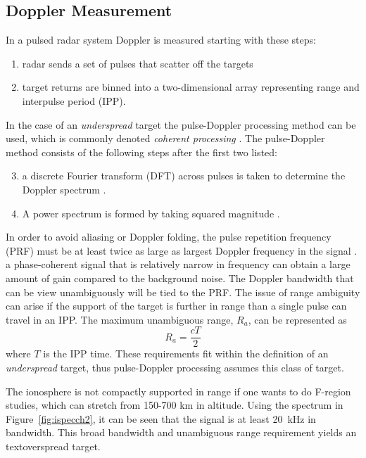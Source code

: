 \subsection{Doppler Measurement}
In a pulsed radar system Doppler is measured starting with these steps:
\begin{enumerate}
\label{list:uno}
\item radar sends a set of pulses that scatter off the targets 
\item target returns are binned into a two-dimensional array representing range and interpulse period (IPP).
\end{enumerate}
In the case of an \textit{underspread} target the pulse-Doppler processing method can be used, which is commonly denoted \textit{coherent processing} \cite{richards2014fundamentals,richards2010principles,richards2014principles,skolnik2008radar}. The pulse-Doppler method consists of the following steps after the first two listed:
\begin{enumerate}
  \setcounter{enumi}{2}
  \item a discrete Fourier transform (DFT) across pulses is taken to determine the Doppler spectrum \cite{richards2014fundamentals}. 
\item A power spectrum is formed by taking squared magnitude .  
\end{enumerate}

In order to avoid aliasing or Doppler folding, the pulse repetition frequency (PRF) must be at least twice as large as largest Doppler frequency in the signal \cite{dtsp:openhiem}. 
a phase-coherent signal that is relatively narrow in frequency can obtain a large amount of gain compared to the background noise. The Doppler bandwidth that can be view unambiguously will be tied to the PRF. The issue of range ambiguity can arise if the support of the target is further in range than a single pulse can travel in an IPP. The maximum unambiguous range, $R_a$, can be represented as 
\begin{equation}
\label{eqn:maxuar}
R_a =  \frac{cT}{2}
\end{equation}
where $T$ is the IPP time. These requirements fit within the definition of an  \textit{underspread} target, thus pulse-Doppler processing assumes this class of target.

The ionosphere is not compactly supported in range if one wants to do F-region studies, which can stretch from 150-700 km in altitude. 
Using the spectrum in Figure~\ref{fig:ispecch2}, it can be seen that the signal is at least 20~kHz in bandwidth.
This broad bandwidth and unambiguous range requirement yields an text{overspread} target. 

